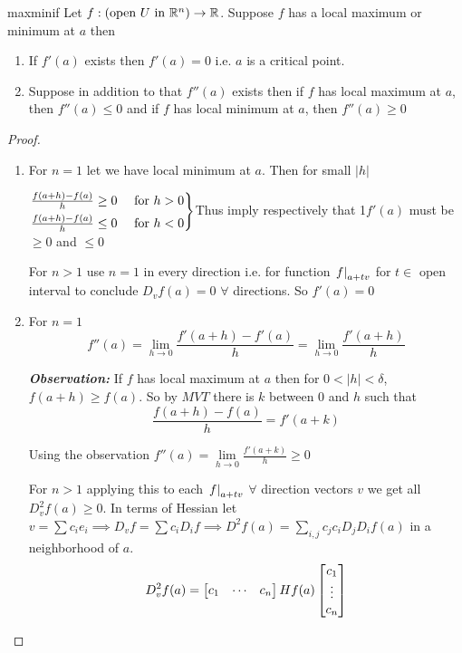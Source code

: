 \begin{theorem}{}{maxminif}
Let $f:(\text{open }U\text{ in }\mathbb{R}^n )\to \mathbb{R}$. Suppose $f $ has a local maximum or minimum  at $a$  then \begin{enumerate}[label=\bfseries\tiny\protect\circled{\small\arabic*}]
	\item If $f'(a)$ exists then $f'(a)=0$ i.e. $a$ is a critical point. 
	\item Suppose in addition to that $f''(a)$  exists then if $f$ has local maximum at $a$, then $f''(a)\leq 0$ and if $f$ has local minimum at $a$, then $f''(a)\geq 0$
\end{enumerate}
\end{theorem}
\begin{proof}
	\begin{enumerate}[label=\bfseries\tiny\protect\circled{\small\arabic*}]
		\item For $n=1$  let we have local minimum at $a$. Then for small $|h|$
		
		\begin{center}
			 $\begin{rcases}
			 	\frac{f(a+h)-f(a)}{h}\geq 0 & \text{ for }h>0 \\
			 	\frac{f(a+h)-f(a)}{h}\leq 0 & \text{ for }h<0
			 \end{rcases}$Thus imply respectively that 1$f'(a)$  must be $\geq 0$ and $\leq 0$
		\end{center}
	For $n>1$  use $n=1$ in every direction i.e. for function $\left. f\right|_{a+tv}$ for $t\in $ open interval  to conclude $D_vf(a)=0$ $\forall$ directions. So $f'(a)=0$\Qed
	\item For $n=1$ $$f''(a)=\lim\limits_{h\to 0}\frac{f'(a+h)-f'(a)}{h}=\lim\limits_{h\to 0}\frac{f'(a+h)}{h}$$ 
	\parinf 
	
	\textbf{\textit{Observation: }}If $f$ has local maximum at $a$ then for $0<|h|<\delta$, $f(a+h)\geq f(a)$. So by $MVT$  there is $k$ between $0$ and $h$  such that $$\frac{f(a+h)-f(a)}{h}=f'(a+k)$$\parinn
	
	Using the observation $f''(a)=\lim\limits_{h\to 0}\frac{f'(a+k)}{h}\geq 0$
	
	For $n>1$ applying this  to each $\left. f\right|_{a+tv}$ $\forall$ direction vectors $v$  we get all $D^2_vf(a)\geq 0$. In terms of Hessian  let $v=\sum c_ie_i\implies D_vf=\sum c_iD_if\implies D^2f(a)=\sum_{i,j}c_jc_iD_jD_if(a) $ in  a neighborhood of $a$. $$D^2_vf(a)=\left[ \begin{matrix}
		c_1 & \cdots & c_n
	\end{matrix} \right]Hf(a)\left[ \begin{matrix}
	c_1\\ \vdots\\ c_n
\end{matrix} \right]$$
	\end{enumerate}
\end{proof}

